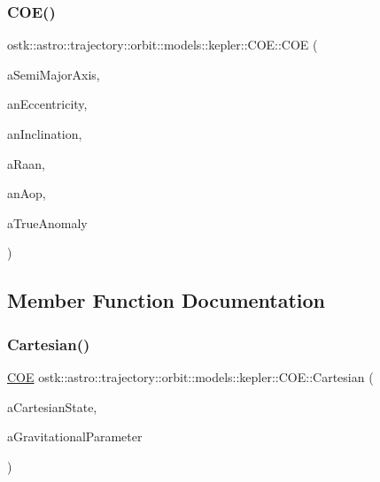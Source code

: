 \subsubsection{\texorpdfstring{C\+O\+E()}{COE()}}
{\footnotesize\ttfamily ostk\+::astro\+::trajectory\+::orbit\+::models\+::kepler\+::\+C\+O\+E\+::\+C\+OE (\begin{DoxyParamCaption}\item[{const Length \&}]{a\+Semi\+Major\+Axis,  }\item[{const Real \&}]{an\+Eccentricity,  }\item[{const Angle \&}]{an\+Inclination,  }\item[{const Angle \&}]{a\+Raan,  }\item[{const Angle \&}]{an\+Aop,  }\item[{const Angle \&}]{a\+True\+Anomaly }\end{DoxyParamCaption})}



\subsection{Member Function Documentation}
\mbox{\label{classostk_1_1astro_1_1trajectory_1_1orbit_1_1models_1_1kepler_1_1_c_o_e_a6fd98b5a37cd8143667c47418513fea5}} 
\subsubsection{\texorpdfstring{Cartesian()}{Cartesian()}}
{\footnotesize\ttfamily \hyperlink{classostk_1_1astro_1_1trajectory_1_1orbit_1_1models_1_1kepler_1_1_c_o_e}{C\+OE} ostk\+::astro\+::trajectory\+::orbit\+::models\+::kepler\+::\+C\+O\+E\+::\+Cartesian (\begin{DoxyParamCaption}\item[{const \hyperlink{classostk_1_1astro_1_1trajectory_1_1orbit_1_1models_1_1kepler_1_1_c_o_e_a410fdbf5aa25ed4651f1b7337c678edc}{C\+O\+E\+::\+Cartesian\+State} \&}]{a\+Cartesian\+State,  }\item[{const Derived \&}]{a\+Gravitational\+Parameter }\end{DoxyParamCaption})\hspace{0.3cm}{\ttfamily [static]}}

